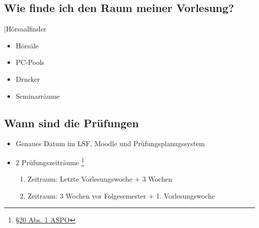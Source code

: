 \documentclass[
	aspectratio=169, 
	10pt 
]{beamer}
\begin{document}
\subsection{Wie finde ich den Raum meiner Vorlesung?}
\begin{frame}{\insertsubsection \space|\space Hörsaalfinder}
    \begin{fancycolumns}[widths={30}]
        
        \nextcolumn
        \centering
        \begin{minipage}[C]{0.8\textwidth}
            \begin{itemize}
                \item Hörsäle
                \item PC-Pools
                \item Drucker 
                \item Seminarräume 
            \end{itemize}
        \end{minipage}
    \end{fancycolumns}
\end{frame}

\subsection{Wann sind die Prüfungen}
\begin{frame}{\insertsubsection}
    \begin{itemize}
        \item Genaues Datum im LSF, Moodle und Prüfungsplanugssystem
        \item 2 Prüfungszeiträume \footnote{\href{https://www.uni-ulm.de/fileadmin/website_uni_ulm/zuv/zuv.dezIII.abt2u3/3-2oeffentlich/bekanntmachungen/2022/veroeffentlichung_asop_final.pdf}{§20 Abs. 1 ASPO}} \begin{enumerate} 
            \item Zeitraum: Letzte Vorlesungswoche + 3 Wochen
            \item Zeitraum: 3 Wochen vor Folgesemester + 1. Vorlesungswoche
        \end{enumerate}
    \end{itemize}
    
\end{frame}
\end{document}
